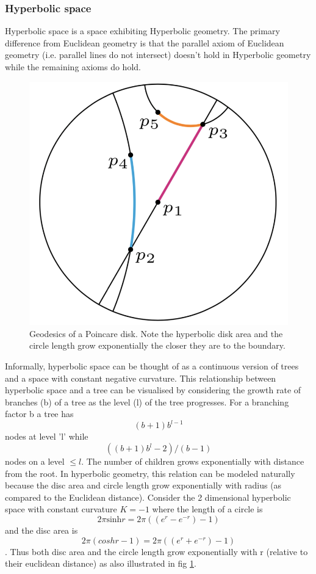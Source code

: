 \subsubsection{Hyperbolic space}
Hyperbolic space is a space exhibiting Hyperbolic geometry. The primary difference from Euclidean geometry is that the parallel axiom of Euclidean geometry (i.e. parallel lines do not intersect) doesn't hold in Hyperbolic geometry while the remaining axioms do hold.
\begin{figure}
    \centering
    \includegraphics[width=.4\textwidth]{chapter_16/files/poincare1.png}
    \caption{Geodesics of a Poincare disk. Note the hyperbolic disk area and the circle length grow exponentially the closer they are to the boundary. }
    \label{hyperb-tree}
\end{figure}
Informally, hyperbolic space can be thought of as a continuous version of trees and a space with constant negative curvature. This relationship between hyperbolic space and a tree can be visualised by considering the growth rate of branches (b) of a tree as the level (l) of the tree progresses. For a branching factor b a tree has $$(b+1)b^{l-1}$$ nodes at level 'l' while $$((b+1)b^l-2)/(b-1)$$ nodes on a level $\leq l$. The number of children grows exponentially with distance from the root. In hyperbolic geometry, this relation can be modeled naturally because the disc area and circle length grow exponentially with radius (as compared to the Euclidean distance). Consider the 2 dimensional hyperbolic space with constant curvature $K=-1$ where the length of a circle is $$2 \pi \text{sinh} r = 2 \pi ((e^r - e^{-r})-1)$$ and the disc area is $$2 \pi (cosh r -1) =2 \pi ((e^r + e^{-r})-1)$$. Thus both disc area and the circle length grow exponentially with r (relative to their euclidean distance) as also illustrated in fig \ref{hyperb-tree}.
